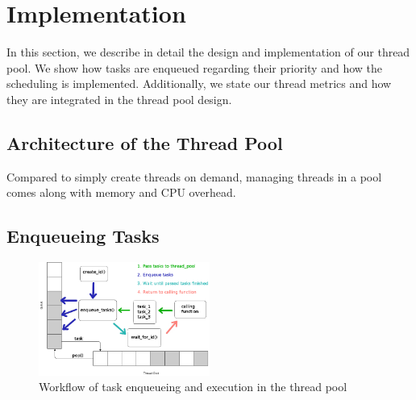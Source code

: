 \documentclass[conference]{IEEEtran}
\begin{document}
%

\section{Implementation}
In this section, we describe in detail the design and implementation of our thread pool. We show how tasks are enqueued regarding their priority and how the scheduling is implemented. Additionally, we state our thread metrics and how they are integrated in the thread pool design. 

\subsection{Architecture of the Thread Pool}
Compared to simply create threads on demand, managing threads in a pool comes along with memory and CPU overhead. 



\subsection{Enqueueing Tasks}
\begin{figure}
	\includegraphics[width=0.5\textwidth]{img/pool_queue.png}
	\caption{Workflow of task enqueueing and execution in the thread pool}
	\label{fig}
\end{figure}
\end{document}
